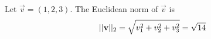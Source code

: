 \begin{example}
    Let $\vec{v} = (1, 2, 3)$. The Euclidean norm of $\vec{v}$ is
    $$ ||\mathbf{v}||_2 = \sqrt{v_1^2 + v_2^2 + v_3^2} = \sqrt{14} $$
\end{example}